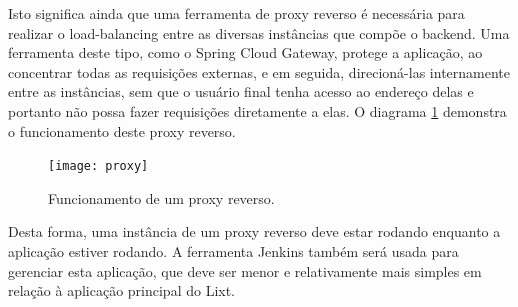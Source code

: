 Isto significa ainda que uma ferramenta de \gls{proxy} reverso é necessária
para realizar o \gls{load-balancing} entre as diversas instâncias que
compõe o \gls{backend}. Uma ferramenta deste tipo, como o Spring Cloud
Gateway, protege a aplicação, ao concentrar todas as requisições
externas, e em seguida, direcioná-las internamente entre as
instâncias, sem que o usuário final tenha acesso ao endereço delas e
portanto não possa fazer requisições diretamente a elas.
O diagrama \ref{fig:proxy} demonstra o funcionamento deste proxy
reverso.

\begin{figure}[!htb]
  \centering
  \caption{Funcionamento de um proxy reverso.}
  \label{fig:proxy}
  \texttt{[image: proxy]}
\end{figure}

Desta forma, uma instância de um proxy reverso deve estar rodando
enquanto a aplicação estiver rodando. A ferramenta Jenkins também será
usada para gerenciar esta aplicação, que deve ser menor e
relativamente mais simples em relação à aplicação principal do Lixt.

